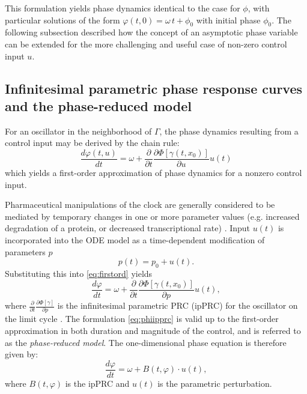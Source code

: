 This formulation yields phase dynamics identical to the case for $\phi$, with particular solutions of the form $\varphi(t,0) = \omega\,t+\phi_0$ with initial phase $\phi_0$.
The following subsection described how the concept of an asymptotic phase variable can be extended for the more challenging and useful case of non-zero control input $u$.

\subsection*{Infinitesimal parametric phase response curves and the phase-reduced model}


For an oscillator in the neighborhood of $\Gamma$, the phase dynamics resulting from a control input may be derived by the chain rule:%
\begin{equation}\label{eq:firstord}
    \frac{d\varphi(t,u)}{dt} = \omega + \frac{\partial}{\partial t}\frac{\partial\mathit{\Phi}[\gamma(t,x_0)]}{\partial u}u(t)
\end{equation}
which yields a first-order approximation of phase dynamics for a nonzero control input.

Pharmaceutical manipulations of the clock are generally considered to be mediated by temporary changes in one or more parameter values (e.g. increased degradation of a protein, or decreased transcriptional rate) \cite{Hirota2012a, Kim2013}.
Input $u(t)$ is incorporated into the ODE model as a time-dependent modification of parameters $p$
\begin{equation}
    p(t) = p_0+u(t).
\end{equation}
Substituting this into \eqref{eq:firstord} yields
\begin{equation}
    \label{eq:phiipprc}
    \frac{d\varphi}{dt} = \omega + \frac{\partial}{\partial t}\frac{\partial\mathit{\Phi}[\gamma(t,x_0)]}{\partial p}u(t),
\end{equation}
where $\frac{\partial}{\partial t}\frac{\partial\mathit{\Phi}[\gamma]}{\partial p}$ is the infinitesimal parametric PRC (ipPRC) for the oscillator on the limit cycle \cite{Taylor2008a}.
The formulation \eqref{eq:phiipprc} is valid up to the first-order approximation in both duration and magnitude of the control, and is referred to as the \textit{phase-reduced model}.
The one-dimensional phase equation is therefore given by:
\begin{equation}\label{eq:osc}
    \frac{d\varphi}{dt} = \omega + B(t, \varphi)\cdot u(t),
\end{equation}
where $B(t,\varphi)$ is the ipPRC and $u(t)$ is the parametric perturbation.


